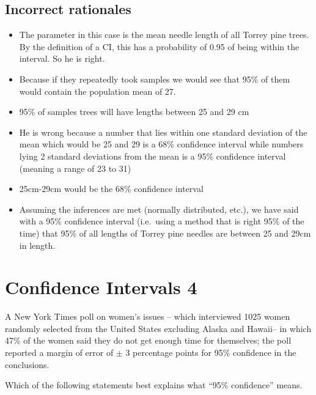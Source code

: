 \documentclass[letterpaper,9pt,twoside,printwatermark=false]{pinp}
\providecommand{\tightlist}{%
  \setlength{\itemsep}{0pt}\setlength{\parskip}{0pt}}
\begin{document}
\subsection{Incorrect rationales}\label{incorrect-rationales-4}

\begin{itemize}
\tightlist
\item
  The parameter in this case is the mean needle length of all Torrey
  pine trees. By the definition of a CI, this has a probability of 0.95
  of being within the interval. So he is right.
\item
  Because if they repeatedly took samples we would see that 95\% of them
  would contain the population mean of 27.
\item
  95\% of samples trees will have lengths between 25 and 29 cm
\item
  He is wrong because a number that lies within one standard deviation
  of the mean which would be 25 and 29 is a 68\% confidence interval
  while numbers lying 2 standard deviations from the mean is a 95\%
  confidence interval (meaning a range of 23 to 31)
\item
  25cm-29cm would be the 68\% confidence interval
\item
  Assuming the inferences are met (normally distributed, etc.), we have
  said with a 95\% confidence interval (i.e.~using a method that is
  right 95\% of the time) that 95\% of all lengths of Torrey pine
  needles are between 25 and 29cm in length.
\end{itemize}

\section{Confidence Intervals 4}\label{confidence-intervals-4}

A New York Times poll on women's issues -- which interviewed 1025 women
randomly selected from the United States excluding Alaska and Hawaii--
in which 47\% of the women said they do not get enough time for
themselves; the poll reported a margin of error of \(\pm\) 3 percentage
points for 95\% confidence in the conclusions.

Which of the following statements best explains what ``95\% confidence''
means.
\end{document}
